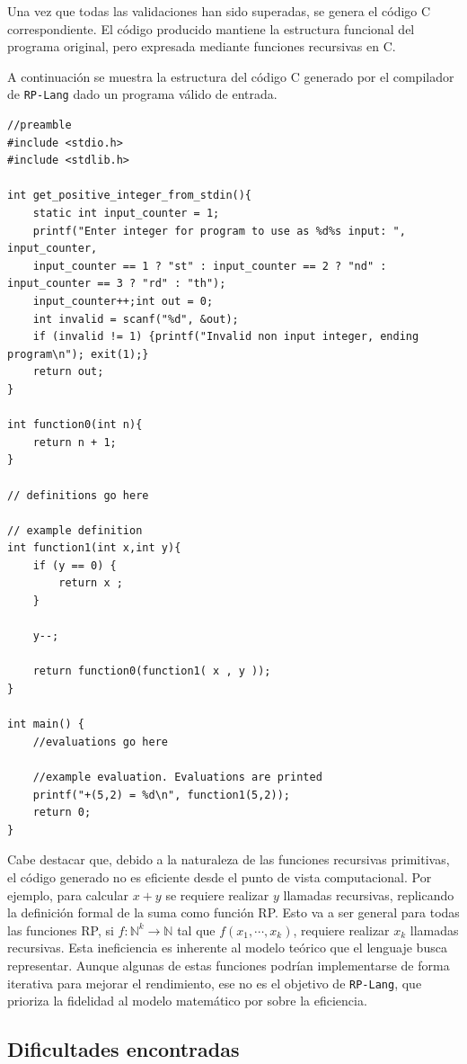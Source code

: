 \documentclass{article}
\newcommand{\rplang}{\texttt{RP-Lang}}
\begin{document}
Una vez que todas las validaciones han sido superadas, se genera el código C correspondiente. El código producido mantiene la estructura funcional del programa original, pero expresada mediante funciones recursivas en C.

A continuación se muestra la estructura del código C generado por el compilador de \rplang{} dado un programa válido de entrada.

\begin{verbatim}
//preamble
#include <stdio.h>
#include <stdlib.h>

int get_positive_integer_from_stdin(){
    static int input_counter = 1;
    printf("Enter integer for program to use as %d%s input: ", input_counter,
    input_counter == 1 ? "st" : input_counter == 2 ? "nd" : input_counter == 3 ? "rd" : "th");
    input_counter++;int out = 0;
    int invalid = scanf("%d", &out);
    if (invalid != 1) {printf("Invalid non input integer, ending program\n"); exit(1);}
    return out;
}

int function0(int n){
    return n + 1;
}

// definitions go here

// example definition
int function1(int x,int y){
    if (y == 0) {
    	return x ;
    }
    
    y--;
    
    return function0(function1( x , y ));
}

int main() {
    //evaluations go here
    
    //example evaluation. Evaluations are printed
    printf("+(5,2) = %d\n", function1(5,2));
    return 0;
}
\end{verbatim}

Cabe destacar que, debido a la naturaleza de las funciones recursivas primitivas, el código generado no es eficiente desde el punto de vista computacional. Por ejemplo, para calcular $x + y$ se requiere realizar $y$ llamadas recursivas, replicando la definición formal de la suma como función RP. Esto va a ser general para todas las funciones RP, si $f:\mathbb N^k\to\mathbb N$ tal que $f(x_1,\cdots,x_k)$, requiere realizar $x_k$ llamadas recursivas. Esta ineficiencia es inherente al modelo teórico que el lenguaje busca representar. Aunque algunas de estas funciones podrían implementarse de forma iterativa para mejorar el rendimiento, ese no es el objetivo de \rplang{}, que prioriza la fidelidad al modelo matemático por sobre la eficiencia.

\subsection {Dificultades encontradas}
\end{document}
